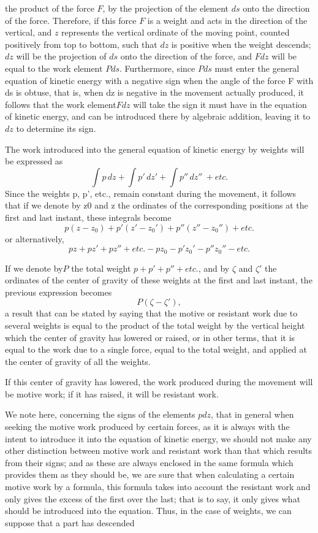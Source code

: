 \documentclass{book}
\begin{document}
the product of the force \(F\), by the projection of the element \(ds\) onto the direction of the force. Therefore, if this force \(F\) is a weight and acts in the direction of the vertical, and \(z\) represents the vertical ordinate of the moving point, counted positively from top to bottom, such that \(dz\) is positive when the weight descends; \(dz\) will be the projection of \(ds\) onto the direction of the force, and \(Fdz\) will be equal to the work element 
 \(Pds\). Furthermore, since \(Pds\) must enter the general equation of kinetic energy with a negative sign when the angle of the force F with ds is obtuse, that is, when dz is negative in the movement actually produced, it follows that the work element\(Fdz\) will take the sign it must have in the equation of kinetic energy, and can be introduced there by algebraic addition, leaving it to \(dz\) to determine its sign.

 The work introduced into the general equation of kinetic energy by weights will be expressed as
\[\int p\,dz + \int p'\,dz' + \int p''\,dz''\ + etc. \]
Since the weights p, p', etc., remain constant during the movement, it follows that if we denote by z0 and z the ordinates of the corresponding positions at the first and last instant, these integrals become
\[ p(z-z_0) + p'(z'-z_0') + p''(z''-z_0'') + etc.\]
or alternatively,
\[ pz + pz' + pz'' + etc. - pz_0 - p'z_0' -  p''z_0'' - etc.\]

If we denote by\(P\) the total weight \(p+p'+p'' + etc.\), and by \(\zeta\) and
\(\zeta'\) the ordinates of the center of gravity of these weights at the first and last instant, the previous expression becomes 
\[P(\zeta-\zeta'),\]
a result that can be stated by saying that the motive or resistant work due to several weights is equal to the product of the total weight by the vertical height which the center of gravity has lowered or raised, or in other terms, that it is equal to the work due to a single force, equal to the total weight, and applied at the center of gravity of all the weights.

If this center of gravity has lowered, the work produced during the movement will be motive work; if it has raised, it will be resistant work.


We note here, concerning the signs of the elements \(pdz\), that in general when seeking the motive work produced by certain forces, as it is always with the intent to introduce it into the equation of kinetic energy, we should not make any other distinction between motive work and resistant work than that which results from their signs; and as these are always enclosed in the same formula which provides them as they should be, we are sure that when calculating a certain motive work by a formula, this formula takes into account the resistant work and only gives the excess of the first over the last; that is to say, it only gives what should be introduced into the equation. Thus, in the case of weights, we can suppose that a part has descended
\newpage
\end{document}
